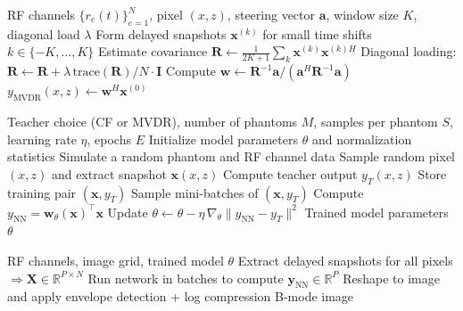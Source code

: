 \documentclass[conference]{IEEEtran}
\begin{document}
\begin{algorithm}[t]
\caption{Simplified MVDR at a single pixel (conceptual)}
\label{alg:mvdr}
\begin{algorithmic}[1]
\REQUIRE RF channels $\{r_e(t)\}_{e=1}^N$, pixel $(x,z)$, steering vector $\mathbf{a}$, window size $K$, diagonal load $\lambda$
\STATE Form delayed snapshots $\mathbf{x}^{(k)}$ for small time shifts $k\in\{-K,\ldots,K\}$
\STATE Estimate covariance $\mathbf{R} \leftarrow \frac{1}{2K+1}\sum_k \mathbf{x}^{(k)}\mathbf{x}^{(k)H}$
\STATE Diagonal loading: $\mathbf{R} \leftarrow \mathbf{R} + \lambda\,\mathrm{trace}(\mathbf{R})/N\cdot \mathbf{I}$
\STATE Compute $\mathbf{w} \leftarrow \mathbf{R}^{-1}\mathbf{a} / (\mathbf{a}^H\mathbf{R}^{-1}\mathbf{a})$
\RETURN $y_{\mathrm{MVDR}}(x,z) \leftarrow \mathbf{w}^H\mathbf{x}^{(0)}$
\end{algorithmic}
\end{algorithm}

\begin{algorithm}[t]
\caption{Teacher--student training for NN beamforming (high-level)}
\label{alg:train}
\begin{algorithmic}[1]
\REQUIRE Teacher choice (CF or MVDR), number of phantoms $M$, samples per phantom $S$, learning rate $\eta$, epochs $E$
\STATE Initialize model parameters $\theta$ and normalization statistics
    \STATE Simulate a random phantom and RF channel data
        \STATE Sample random pixel $(x,z)$ and extract snapshot $\mathbf{x}(x,z)$
        \STATE Compute teacher output $y_T(x,z)$
        \STATE Store training pair $(\mathbf{x}, y_T)$
    \ENDFOR
\ENDFOR
{}
    \STATE Sample mini-batches of $(\mathbf{x}, y_T)$
    \STATE Compute $y_{\mathrm{NN}} = \mathbf{w}_\theta(\mathbf{x})^\top \mathbf{x}$
    \STATE Update $\theta \leftarrow \theta - \eta\,\nabla_\theta \|y_{\mathrm{NN}}-y_T\|^2$
\ENDFOR
\RETURN Trained model parameters $\theta$
\end{algorithmic}
\end{algorithm}

\begin{algorithm}[t]
\caption{Full-image NN inference (conceptual)}
\label{alg:infer}
\begin{algorithmic}[1]
\REQUIRE RF channels, image grid, trained model $\theta$
\STATE Extract delayed snapshots for all pixels $\Rightarrow \mathbf{X}\in\mathbb{R}^{P\times N}$
\STATE Run network in batches to compute $\mathbf{y}_{\mathrm{NN}}\in\mathbb{R}^{P}$
\STATE Reshape to image and apply envelope detection + log compression
\RETURN B-mode image
\end{algorithmic}
\end{algorithm}
\end{document}
